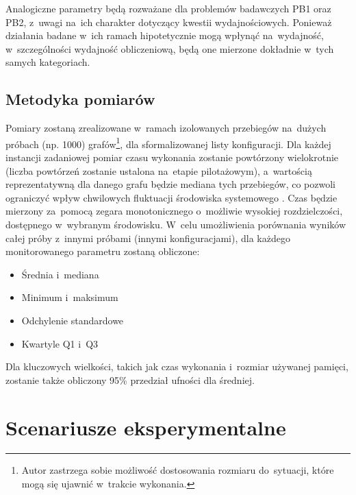 \documentclass[11pt,a4paper,oneside]{report}
\begin{document}
Analogiczne parametry będą rozważane dla problemów badawczych PB1 oraz PB2, z~uwagi na~ich charakter dotyczący kwestii wydajnościowych. Ponieważ działania badane w~ich ramach hipotetycznie mogą wpłynąć na~wydajność, w~szczególności wydajność obliczeniową, będą one mierzone dokładnie w~tych samych kategoriach.

\subsection{Metodyka pomiarów}

Pomiary zostaną zrealizowane w~ramach izolowanych przebiegów na~dużych próbach (np. 1000) grafów\footnote{Autor zastrzega sobie możliwość dostosowania rozmiaru do~sytuacji, które mogą się ujawnić w~trakcie wykonania.}, dla sformalizowanej listy konfiguracji. Dla każdej instancji zadaniowej pomiar czasu wykonania zostanie powtórzony wielokrotnie (liczba powtórzeń zostanie ustalona na~etapie pilotażowym), a~wartością reprezentatywną dla danego grafu będzie mediana tych przebiegów, co pozwoli ograniczyć wpływ chwilowych fluktuacji środowiska systemowego \cite{pieterse-2014-performancemeasurements}. Czas będzie mierzony za~pomocą zegara monotonicznego o~możliwie wysokiej rozdzielczości, dostępnego w~wybranym środowisku. W~celu umożliwienia porównania wyników całej próby z~innymi próbami (innymi konfiguracjami), dla każdego monitorowanego parametru zostaną obliczone:
\begin{itemize}
	\item Średnia i~mediana
	\item Minimum i~maksimum
	\item Odchylenie standardowe
	\item Kwartyle Q1 i~Q3
\end{itemize}
Dla kluczowych wielkości, takich jak czas wykonania i~rozmiar używanej pamięci, zostanie także obliczony 95\% przedział ufności dla średniej.

\section{Scenariusze eksperymentalne}

\begin{center}
\end{center}
\end{document}
